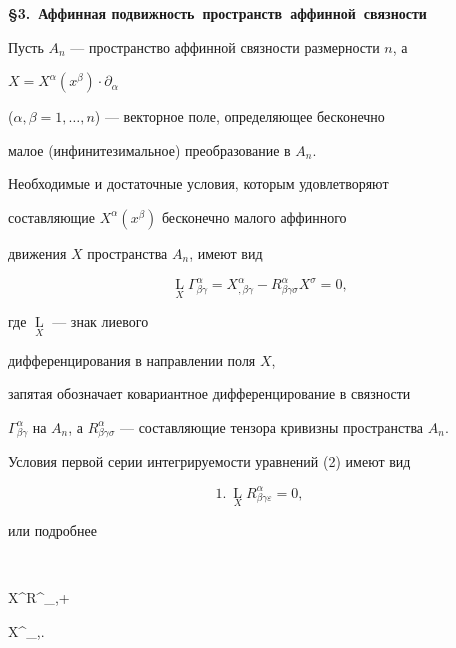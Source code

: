 \centerline{\bf \S 3.~Аффинная подвижность~пространств~аффинной~связности}


\medskip








Пусть $A_n$ --- пространство аффинной связности размерности $n$, а


$X=X^{\alpha}(x^{\beta})\cdot \partial_{\alpha}$


($\alpha,\beta=1,\dotsc,n$) --- векторное поле, определяющее бесконечно


малое (инфинитезимальное) преобразование в $A_n$.


Необходимые и достаточные условия, которым удовлетворяют


составляющие $X^{\alpha}(x^\beta)$ бесконечно малого аффинного


движения $X$ пространства $A_n$, имеют вид


\begin{equation}


\mathop{L}\limits_{X}\Gamma^{\alpha}_{\beta \gamma}=X^{\alpha}_{,\beta


\gamma}-R^{\alpha}_{\beta \gamma\sigma}X^{\sigma}=0,


\end{equation}


где $\mathop{ L}\limits_{X}$ --- знак лиевого


дифференцирования в направлении поля $X$,


запятая обозначает ковариантное дифференцирование в связности


$\Gamma^{\alpha}_{\beta \gamma}$ на $A_n$, а $ R^{\alpha}_{\beta


\gamma\sigma}$ --- составляющие тензора кривизны пространства $A_n$.





Условия первой серии интегрируемости уравнений (2) имеют вид


\begin{equation}


1. \ \mathop{ L}\limits_{X}R^{\alpha}_{\beta \gamma\varepsilon}=0,


\end{equation}


или подробнее


$$


X^{\sigma}R^{\alpha}_{\beta \gamma \varepsilon,\sigma }+


X^{\tau}_{,\sigma}.


